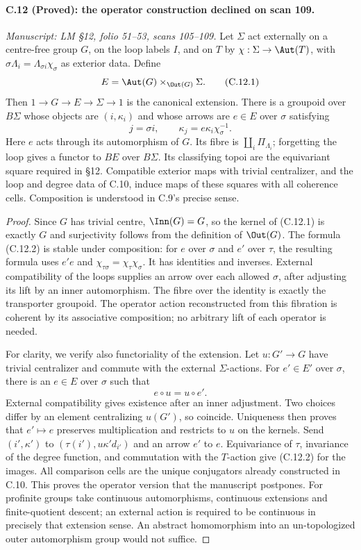 \paragraph{C.12 (Proved): the operator construction declined on scan 109.}\label{C12}
\textit{Manuscript: LM \S12, folio 51--53, scans 105--109.}
Let $\Sigma$ act externally on a
centre-free group $G$, on the
loop labels $I$, and on $T$ by
$\chi:\Sigma\to\Aut(T)$, with
$\sigma\Lambda_i=\Lambda_{\sigma i}\chi_\sigma$
as exterior data. Define
\[
 E=\Aut(G)\times_{\Out(G)}\Sigma.
                                                               \tag{C.12.1}
\]
Then $1\to G\to E\to\Sigma\to1$
is the canonical extension.
There is a groupoid over $B\Sigma$
whose objects are $(i,\kappa_i)$
and whose arrows are $e\in E$
over $\sigma$ satisfying
\[
 j=\sigma i,\qquad
 \kappa_j=e\kappa_i\chi_\sigma^{-1}.
                                                               \tag{C.12.2}
\]
Here $e$ acts through its
automorphism of $G$. Its fibre
is $\coprod_i\Pi_{\Lambda_i}$;
forgetting the loop gives a
functor to $BE$ over $B\Sigma$.
Its classifying topoi are the
equivariant square required in
\S12. Compatible exterior maps
with trivial centralizer, and
the loop and degree data of
C.10, induce maps of these
squares with all coherence
cells. Composition is understood
in C.9's precise sense.

\begin{proof}
Since $G$ has trivial centre,
$\Inn(G)=G$, so the kernel of
(C.12.1) is exactly $G$ and
surjectivity follows from the
definition of $\Out(G)$. The
formula (C.12.2) is stable under
composition: for $e$ over
$\sigma$ and $e'$ over $\tau$,
the resulting formula uses
$e'e$ and
$\chi_{\tau\sigma}=\chi_\tau\chi_\sigma$.
It has identities and inverses.
External compatibility of the
loops supplies an arrow over
each allowed $\sigma$, after
adjusting its lift by an inner
automorphism. The fibre over
the identity is exactly the
transporter groupoid. The
operator action reconstructed
from this fibration is coherent
by its associative composition;
no arbitrary lift of each
operator is needed.

For clarity, we verify also
functoriality of the extension.
Let $u:G'\to G$ have trivial
centralizer and commute with
the external $\Sigma$-actions.
For $e'\in E'$ over $\sigma$,
there is an $e\in E$ over
$\sigma$ such that
\[
                  e\circ u=u\circ e'.
\]
External compatibility gives
existence after an inner
adjustment. Two choices differ
by an element centralizing
$u(G')$, so coincide. Uniqueness
then proves that $e'\mapsto e$
preserves multiplication and
restricts to $u$ on the kernels.
Send $(i',\kappa')$ to
$(\tau(i'),u\kappa'd_{i'})$
and an arrow $e'$ to $e$.
Equivariance of $\tau$, invariance
of the degree function, and
commutation with the $T$-action
give (C.12.2) for the images.
All comparison cells are the
unique conjugators already
constructed in C.10. This
proves the operator version
that the manuscript postpones.
For profinite groups take
continuous automorphisms,
continuous extensions and
finite-quotient descent; an
external action is required
to be continuous in precisely
that extension sense. An
abstract homomorphism into an
un-topologized outer automorphism
group would not suffice.
\end{proof}
